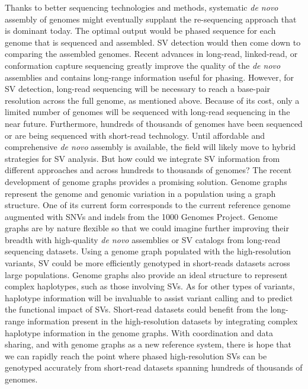 Thanks to better sequencing technologies and methods, systematic {\it de novo} assembly of genomes might eventually supplant the re-sequencing approach that is dominant today.
The optimal output would be phased sequence for each genome that is sequenced and assembled.
SV detection would then come down to comparing the assembled genomes.
Recent advances in long-read, linked-read, or conformation capture sequencing greatly improve the quality of the {\it de novo} assemblies and contains long-range information useful for phasing.
However, for SV detection, long-read sequencing will be necessary to reach a base-pair resolution across the full genome, as mentioned above.
Because of its cost, only a limited number of genomes will be sequenced with long-read sequencing in the near future.
Furthermore, hundreds of thousands of genomes have been sequenced or are being sequenced with short-read technology.
Until affordable and comprehensive {\it de novo} assembly is available, the field will likely move to hybrid strategies for SV analysis.
But how could we integrate SV information from different approaches and across hundreds to thousands of genomes?
The recent development of genome graphs provides a promising solution\cite{Paten2017}.
Genome graphs represent the genome and genomic variation in a population using a graph structure.
One of its current form corresponds to the current reference genome augmented with SNVs and indels from the 1000 Genomes Project\cite{Garrison2017}.
Genome graphs are by nature flexible so that we could imagine further improving their breadth with high-quality {\it de novo} assemblies or SV catalogs from long-read sequencing datasets.
Using a genome graph populated with the high-resolution variants, SV could be more efficiently genotyped in short-reads datasets across large populations.
Genome graphs also provide an ideal structure to represent complex haplotypes, such as those involving SVs.
As for other types of variants, haplotype information will be invaluable to assist variant calling and to predict the functional impact of SVs.
Short-read datasets could benefit from the long-range information present in the high-resolution datasets by integrating complex haplotype information in the genome graphs.
With coordination and data sharing, and with genome graphs as a new reference system, there is hope that we can rapidly reach the point where phased high-resolution SVs can be genotyped accurately from short-read datasets spanning hundreds of thousands of genomes.





